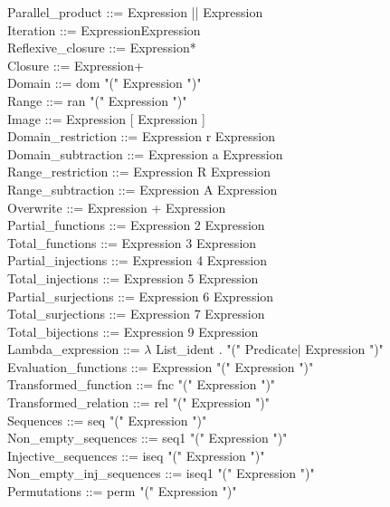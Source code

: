 \documentclass[12pt,a4paper,draft]{article}
\begin{document}
{\begin{sloppypar}
Parallel\_product  ::=  Expression || Expression \\
Iteration    ::=  ExpressionExpression \\
Reflexive\_closure   ::=  Expression* \\
Closure    ::=  Expression+ \\
Domain   ::=  dom "(" Expression ")" \\
Range   ::=  ran "(" Expression ")" \\
Image    ::=  Expression [ Expression ] \\
Domain\_restriction   ::=  Expression r Expression \\
Domain\_subtraction  ::=  Expression a Expression \\
Range\_restriction   ::=  Expression R Expression \\
Range\_subtraction   ::=  Expression A Expression \\
Overwrite   ::=  Expression + Expression \\
Partial\_functions  ::=  Expression 2 Expression \\
Total\_functions  ::=  Expression 3 Expression \\
Partial\_injections  ::=  Expression 4 Expression \\
Total\_injections  ::=  Expression 5 Expression \\
Partial\_surjections  ::= Expression 6 Expression \\
Total\_surjections  ::=  Expression 7 Expression \\
Total\_bijections   ::=  Expression 9 Expression \\
Lambda\_expression   ::= $\lambda$ List\_ident . "(" Predicate$|$ Expression ")" \\
Evaluation\_functions   ::= Expression "(" Expression ")" \\
Transformed\_function   ::= fnc "(" Expression ")" \\
Transformed\_relation  ::= rel "(" Expression ")" \\
Sequences    ::= seq "(" Expression ")" \\
Non\_empty\_sequences  ::= seq1 "(" Expression ")" \\
Injective\_sequences  ::= iseq "(" Expression ")" \\
Non\_empty\_inj\_sequences  ::= iseq1 "(" Expression ")" \\
Permutations   ::= perm "(" Expression ")" \\

\end{sloppypar}}
\end{document}
